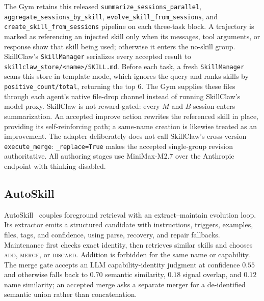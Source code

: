 \documentclass{article}
\begin{document}
The Gym retains this released \texttt{summarize\_sessions\_parallel},
\texttt{aggregate\_sessions\_by\_skill},
\texttt{evolve\_skill\_from\_sessions}, and
\texttt{create\_skill\_from\_sessions} pipeline on each three-task block. A
trajectory is marked as referencing an injected skill only when its messages,
tool arguments, or response show that skill being used; otherwise it enters the
no-skill group. SkillClaw's \texttt{SkillManager} serializes every accepted result
to \texttt{skillclaw\_store/<name>/SKILL.md}. Before each task, a fresh
\texttt{SkillManager} scans this store in template mode, which ignores the query and
ranks skills by \texttt{positive\_count/total}, returning the top $6$. The Gym supplies
these files through each agent's native file-drop channel instead of running
SkillClaw's model proxy. SkillClaw is not reward-gated: every $M$ and $B$ session
enters summarization. An accepted improve action rewrites the referenced skill in
place, providing its self-reinforcing path; a same-name creation is likewise
treated as an improvement. The adapter deliberately does not call SkillClaw's
cross-version \texttt{execute\_merge}: \texttt{\_replace=True} makes the accepted
single-group revision authoritative. All authoring stages use MiniMax-M2.7 over
the Anthropic endpoint with thinking disabled.

\subsection{AutoSkill}

AutoSkill~\citep{yang2026autoskill} couples foreground retrieval with an
extract--maintain evolution loop. Its extractor emits a structured candidate with
instructions, triggers, examples, files, tags, and confidence, using parse,
recovery, and repair fallbacks. Maintenance first checks exact identity, then
retrieves similar skills and chooses \textsc{add}, \textsc{merge}, or
\textsc{discard}. Addition is forbidden for the same name or capability. The merge
gate accepts an LLM capability-identity judgment at confidence $0.55$ and otherwise
falls back to $0.70$ semantic similarity, $0.18$ signal overlap, and $0.12$ name
similarity; an accepted merge
asks a separate merger for a de-identified semantic union rather than concatenation.
\end{document}
